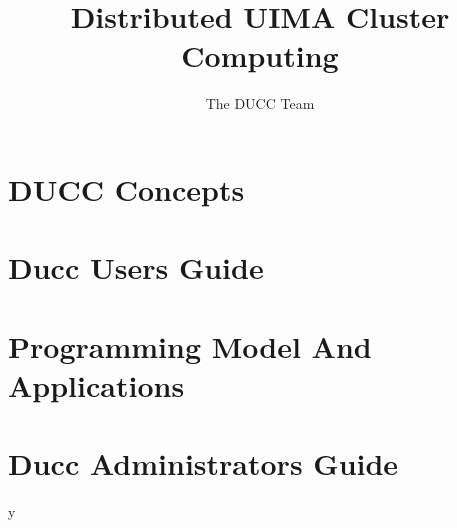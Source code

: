 \documentclass[letterpaper]{book}
\title{\Huge \textbf{Distributed UIMA Cluster Computing}}
\author{The DUCC Team}
\begin{document}
\frontmatter
\maketitle

\tableofcontents
\listoffigures

\mainmatter

\newcommand{\ducchome}{\$DUCC\_HOME}
\newcommand{\todo}{{\sc \Large TODO:}  }
\newcommand{\note}{{\em Note:}  }

\part{DUCC Concepts}




\part{Ducc Users Guide}


\part{Programming Model And Applications}


\part{Ducc Administrators Guide}
y
\end{document}
